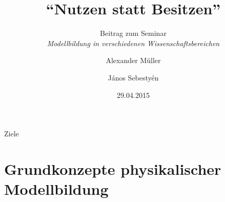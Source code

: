 \documentclass[beamer]{beamer}
\title{"`Nutzen statt Besitzen"'}
\subtitle{Beitrag zum Seminar\\\textit{Modellbildung in verschiedenen Wissenschaftsbereichen}}
\author{Alexander Müller \and János Sebestyén}
\date{29.04.2015}
\begin{document}
\frame{\titlepage}


\begin{frame}{Ziele}
  \begin{center}
  \end{center}
\end{frame}

\section{Grundkonzepte physikalischer Modellbildung}
\end{document}
